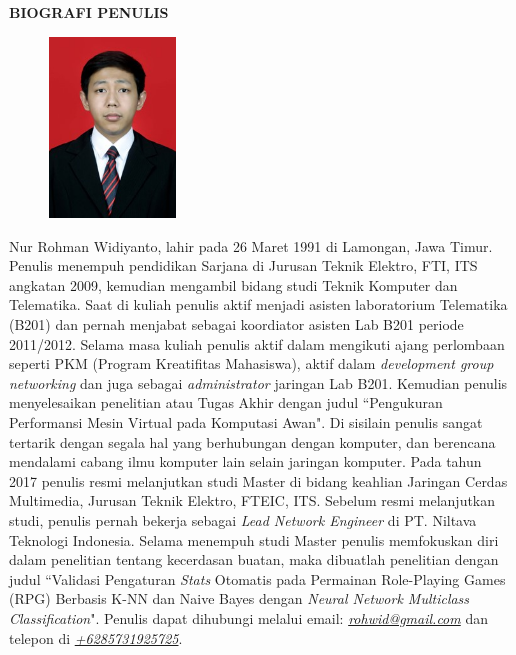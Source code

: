 \begin{center}
\large\textbf{BIOGRAFI PENULIS}
\end{center}
\vspace{1ex}

\begin{figure}
	\centering
	\vspace{-3ex}	
	\includegraphics[width=0.3\textwidth]{img/aku.jpg}
	\vspace{-4ex}
\end{figure}

\noindent Nur Rohman Widiyanto, lahir pada 26 Maret 1991 di Lamongan, Jawa Timur.
Penulis menempuh pendidikan Sarjana di Jurusan Teknik Elektro, FTI, ITS angkatan 2009, kemudian mengambil bidang studi Teknik Komputer dan Telematika. Saat di kuliah penulis aktif menjadi asisten laboratorium Telematika (B201) dan pernah menjabat sebagai koordiator asisten Lab B201 periode 2011/2012. Selama masa kuliah penulis aktif dalam mengikuti ajang perlombaan seperti PKM (Program Kreatifitas Mahasiswa), aktif dalam \textit{development group networking} dan juga sebagai \textit{administrator} jaringan Lab B201. Kemudian penulis menyelesaikan penelitian atau Tugas Akhir dengan judul ``Pengukuran Performansi Mesin Virtual pada Komputasi Awan". Di sisilain penulis sangat tertarik dengan segala hal yang berhubungan dengan komputer, dan berencana mendalami cabang ilmu komputer lain selain jaringan komputer. Pada tahun 2017 penulis resmi melanjutkan studi Master di bidang keahlian Jaringan Cerdas Multimedia, Jurusan Teknik Elektro, FTEIC, ITS. Sebelum resmi melanjutkan studi, penulis pernah bekerja sebagai \textit{Lead Network Engineer} di PT. Niltava Teknologi Indonesia. Selama menempuh studi Master penulis memfokuskan diri dalam penelitian tentang kecerdasan buatan, maka dibuatlah penelitian dengan judul ``Validasi Pengaturan \textit{Stats} Otomatis pada Permainan Role-Playing Games (RPG) Berbasis K-NN dan Naive Bayes dengan \textit{Neural Network Multiclass Classification}". Penulis dapat dihubungi melalui email: \underline{\textit{rohwid@gmail.com}} dan telepon di \underline{\textit{+6285731925725}}.
